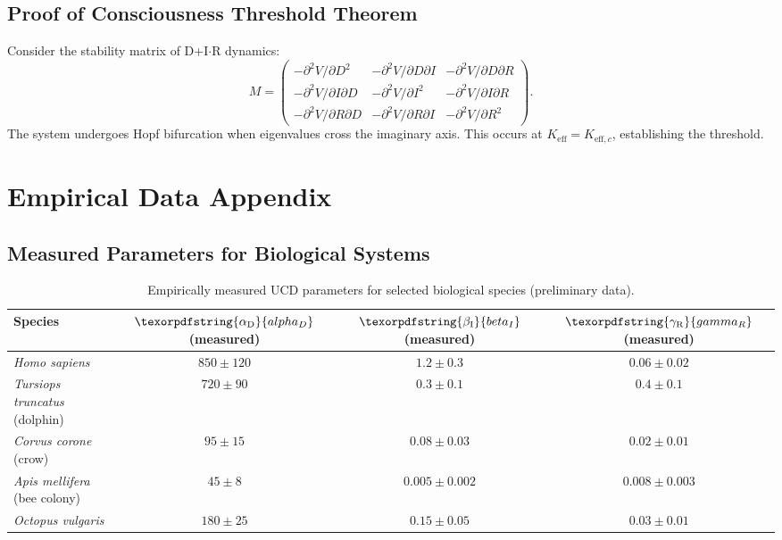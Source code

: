 \documentclass[12pt,a4paper]{article}
\DeclareRobustCommand{\alD}{\texorpdfstring{\ensuremath{\alpha_{\mathrm{D}}}}{alpha_D}}
\DeclareRobustCommand{\beI}{\texorpdfstring{\ensuremath{\beta_{\mathrm{I}}}}{beta_I}}
\DeclareRobustCommand{\gaR}{\texorpdfstring{\ensuremath{\gamma_{\mathrm{R}}}}{gamma_R}}
\newcommand{\eff}{\mathrm{eff}}
\newcommand{\Ke}{K_{\eff}}
\newcommand{\Kec}{K_{\eff,c}}
\begin{document}
	\subsection{Proof of Consciousness Threshold Theorem}
	
	Consider the stability matrix of D+I\(\cdot\)R dynamics:
	\[
	M = \begin{pmatrix}
		-\partial^2 V/\partial D^2 & -\partial^2 V/\partial D\partial I & -\partial^2 V/\partial D\partial R \\
		-\partial^2 V/\partial I\partial D & -\partial^2 V/\partial I^2 & -\partial^2 V/\partial I\partial R \\
		-\partial^2 V/\partial R\partial D & -\partial^2 V/\partial R\partial I & -\partial^2 V/\partial R^2
	\end{pmatrix}.
	\]
	The system undergoes Hopf bifurcation when eigenvalues cross the imaginary axis. This occurs at \(\Ke = \Kec\), establishing the threshold.
	
	\section{Empirical Data Appendix}
	
	\subsection{Measured Parameters for Biological Systems}
	
	\begin{table}[ht]
		\centering
		\begin{tabular}{lccc}
			\toprule
			\textbf{Species} & \(\alD\) (measured) & \(\beI\) (measured) & \(\gaR\) (measured) \\
			\midrule
			\textit{Homo sapiens} & \(850 \pm 120\) & \(1.2 \pm 0.3\) & \(0.06 \pm 0.02\) \\
			\textit{Tursiops truncatus} (dolphin) & \(720 \pm 90\) & \(0.3 \pm 0.1\) & \(0.4 \pm 0.1\) \\
			\textit{Corvus corone} (crow) & \(95 \pm 15\) & \(0.08 \pm 0.03\) & \(0.02 \pm 0.01\) \\
			\textit{Apis mellifera} (bee colony) & \(45 \pm 8\) & \(0.005 \pm 0.002\) & \(0.008 \pm 0.003\) \\
			\textit{Octopus vulgaris} & \(180 \pm 25\) & \(0.15 \pm 0.05\) & \(0.03 \pm 0.01\) \\
			\bottomrule
		\end{tabular}
		\caption{Empirically measured UCD parameters for selected biological species (preliminary data).}
		\label{tab:bio-measurements}
	\end{table}
	
\end{document}
